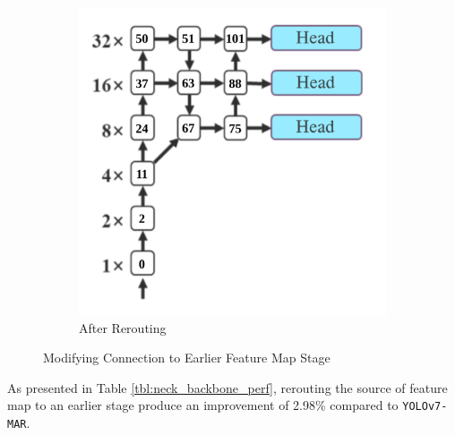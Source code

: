 \begin{figure}
\begin{subfigure}[][][t]{0.4\textwidth}
      \includegraphics[width=1\linewidth]{figures/deeperconn-after.png}
      \caption{After Rerouting}
      \label{fig:deeperconn-after}
    \end{subfigure}
    \caption{Modifying Connection to Earlier Feature Map Stage}
    \label{fig:deeperconn}
\end{figure}

As presented in Table \ref{tbl:neck_backbone_perf}, rerouting the source of 
feature map to an earlier stage produce an improvement of 2.98\% compared to \verb*|YOLOv7-MAR|.

\begin{table}
  \centering
  \label{tbl:neck_backbone_perf}
  \vspace{-1ex}
  
\end{table}

\vspace{2ex}

